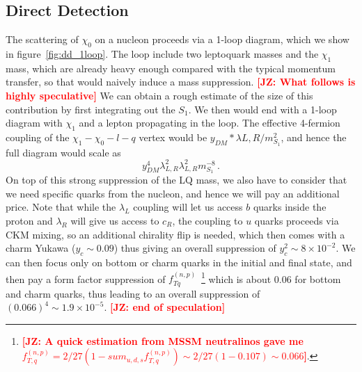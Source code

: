 \documentclass[11pt]{cernrep}
\newcommand{\be}{\begin{equation}}
\newcommand{\ee}{\end{equation}}
\def\JZ#1{{\bf  \textcolor{red}{[JZ: {#1}]}}}
\begin{document}
\subsection{Direct Detection}
The scattering of $\chi_0$ on a nucleon proceeds via a 1-loop diagram, which we show in figure~\ref{fig:dd_1loop}. The loop include two leptoquark masses and the $\chi_1$ mass, which are already heavy enough compared with the typical momentum transfer, so that would naively induce a mass suppression. 
\JZ{What follows is highly speculative}
We can obtain a rough estimate of the size of this contribution by first integrating out the $S_1$. We then would end with a 1-loop diagram with $\chi_1$ and a lepton propagating in the loop. The effective 4-fermion coupling of the $\chi_1-\chi_0 -l-q$ vertex would be $y_{DM} * \lambda{L,R} / m_{S_1}^2$, and hence the full diagram would scale as
\be
y_{DM}^4 \lambda_{L,R}^2 \lambda_{L,R}^2 m_{S_1}^{-8} \, .
\ee
On top of this strong suppression of the LQ mass, we also have to consider that we need specific quarks from the nucleon, and hence we will pay an additional price. Note that while the $\lambda_L$ coupling will let us access $b$ quarks inside the proton and $\lambda_R$ will give us access to $c_R$, the coupling to $u$ quarks proceeds via CKM mixing, so an additional chirality flip is needed, which then comes with a charm Yukawa ($y_c \sim 0.09$) thus giving an overall suppression of $y_c^2 \sim 8 \times 10^{-2}$. We can then focus only on bottom or charm quarks in the initial and final state, and then pay a form factor suppression of $f_{T q}^(n,p)$~\footnote{\JZ{A quick estimation from MSSM neutralinos gave me $f^{(n,p)}_{T,q} = 2/27 (1 - sum_{u,d,s} f^{(n,p)}_{T,q} ) \sim 2/27 (1-0.107) \sim 0.066 $}.} which is about 0.06 for bottom and charm quarks, thus leading to an overall suppression of $(0.066)^4 \sim 1.9 \times 10^{-5} $.
\JZ{end of speculation}
\end{document}
